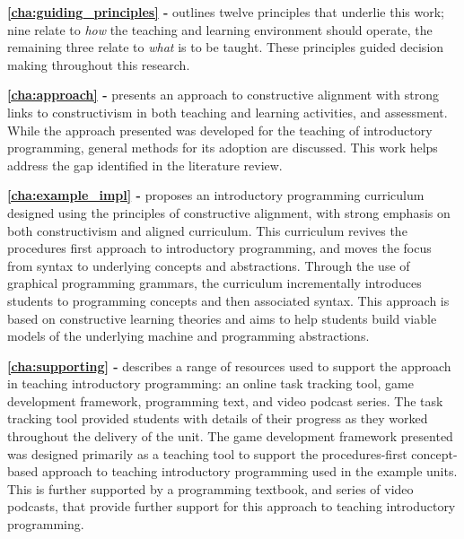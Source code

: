 \textbf{\cref{cha:guiding_principles} - } outlines twelve principles that underlie this work; nine relate to \emph{how} the teaching and learning environment should operate, the remaining three relate to \emph{what} is to be taught. These principles guided decision making throughout this research.

\textbf{\cref{cha:approach} - } presents an approach to constructive alignment with strong links to constructivism in both teaching and learning activities, and assessment. While the approach presented was developed for the teaching of introductory programming, general methods for its adoption are discussed. This work helps address the gap identified in the literature review.

\textbf{\cref{cha:example_impl} - } proposes an introductory programming curriculum designed using the principles of constructive alignment, with strong emphasis on both constructivism and aligned curriculum. This curriculum revives the procedures first approach to introductory programming, and moves the focus from syntax to underlying concepts and abstractions. Through the use of graphical programming grammars, the curriculum incrementally introduces students to programming concepts and then associated syntax. This approach is based on constructive learning theories and aims to help students build viable models of the underlying machine and programming abstractions. 
 
\textbf{\cref{cha:supporting} - } describes a range of resources used to support the approach in teaching introductory programming: an online task tracking tool, game development framework, programming text, and video podcast series. The task tracking tool provided students with details of their progress as they worked throughout the delivery of the unit. The  game development framework presented was designed primarily as a teaching tool to support the procedures-first concept-based approach to teaching introductory programming used in the example units. This is further supported by a programming textbook, and series of video podcasts, that provide further support for this approach to teaching introductory programming. 

